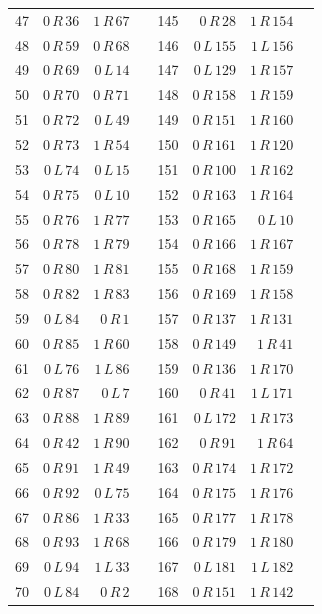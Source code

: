 \begin{longtable}{rrrrrrrr}
47 & $0\,R\,36$ & $1\,R\,67$ & & 145 & $0\,R\,28$ & $1\,R\,154$ &\\
48 & $0\,R\,59$ & $0\,R\,68$ & & 146 & $0\,L\,155$ & $1\,L\,156$ &\\
49 & $0\,R\,69$ & $0\,L\,14$ & & 147 & $0\,L\,129$ & $1\,R\,157$ &\\
50 & $0\,R\,70$ & $0\,R\,71$ & & 148 & $0\,R\,158$ & $1\,R\,159$ &\\
51 & $0\,R\,72$ & $0\,L\,49$ & & 149 & $0\,R\,151$ & $1\,R\,160$ &\\
52 & $0\,R\,73$ & $1\,R\,54$ & & 150 & $0\,R\,161$ & $1\,R\,120$ &\\
53 & $0\,L\,74$ & $0\,L\,15$ & & 151 & $0\,R\,100$ & $1\,R\,162$ &\\
54 & $0\,R\,75$ & $0\,L\,10$ & & 152 & $0\,R\,163$ & $1\,R\,164$ &\\
55 & $0\,R\,76$ & $1\,R\,77$ & & 153 & $0\,R\,165$ & $0\,L\,10$ &\\
56 & $0\,R\,78$ & $1\,R\,79$ & & 154 & $0\,R\,166$ & $1\,R\,167$ &\\
57 & $0\,R\,80$ & $1\,R\,81$ & & 155 & $0\,R\,168$ & $1\,R\,159$ &\\
58 & $0\,R\,82$ & $1\,R\,83$ & & 156 & $0\,R\,169$ & $1\,R\,158$ &\\
59 & $0\,L\,84$ & $0\,R\,1$ & & 157 & $0\,R\,137$ & $1\,R\,131$ &\\
60 & $0\,R\,85$ & $1\,R\,60$ & & 158 & $0\,R\,149$ & $1\,R\,41$ &\\
61 & $0\,L\,76$ & $1\,L\,86$ & & 159 & $0\,R\,136$ & $1\,R\,170$ &\\
62 & $0\,R\,87$ & $0\,L\,7$ & & 160 & $0\,R\,41$ & $1\,L\,171$ &\\
63 & $0\,R\,88$ & $1\,R\,89$ & & 161 & $0\,L\,172$ & $1\,R\,173$ &\\
64 & $0\,R\,42$ & $1\,R\,90$ & & 162 & $0\,R\,91$ & $1\,R\,64$ &\\
65 & $0\,R\,91$ & $1\,R\,49$ & & 163 & $0\,R\,174$ & $1\,R\,172$ &\\
66 & $0\,R\,92$ & $0\,L\,75$ & & 164 & $0\,R\,175$ & $1\,R\,176$ &\\
67 & $0\,R\,86$ & $1\,R\,33$ & & 165 & $0\,R\,177$ & $1\,R\,178$ &\\
68 & $0\,R\,93$ & $1\,R\,68$ & & 166 & $0\,R\,179$ & $1\,R\,180$ &\\
69 & $0\,L\,94$ & $1\,L\,33$ & & 167 & $0\,L\,181$ & $1\,L\,182$ &\\
70 & $0\,L\,84$ & $0\,R\,2$ & & 168 & $0\,R\,151$ & $1\,R\,142$ &\\

\end{longtable}
